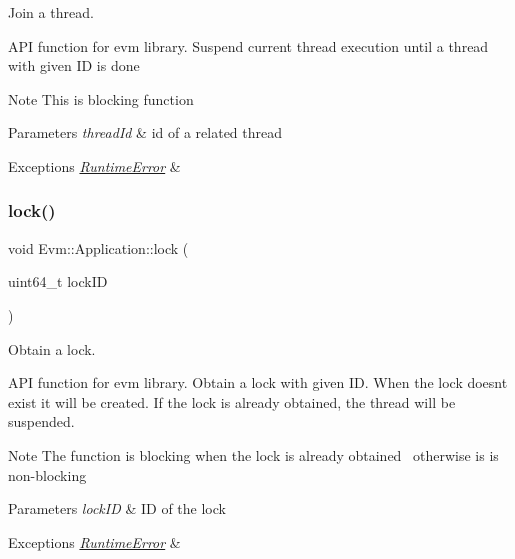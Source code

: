 Join a thread. 

A\+PI function for evm library. Suspend current thread execution until a thread with given ID is done \begin{DoxyNote}{Note}
This is blocking function 
\end{DoxyNote}

\begin{DoxyParams}{Parameters}
{\em thread\+Id} & id of a related thread \\
\hline
\end{DoxyParams}

\begin{DoxyExceptions}{Exceptions}
{\em \mbox{\hyperlink{struct_evm_1_1_runtime_error}{Runtime\+Error}}} & \\
\hline
\end{DoxyExceptions}
\mbox{\label{struct_evm_1_1_application_a102467a47420ec04d5ab1e68bd465579}} 
\subsubsection{\texorpdfstring{lock()}{lock()}}
{\footnotesize\ttfamily void Evm\+::\+Application\+::lock (\begin{DoxyParamCaption}\item[{uint64\+\_\+t}]{lock\+ID }\end{DoxyParamCaption})}



Obtain a lock. 

A\+PI function for evm library. Obtain a lock with given ID. When the lock doesn\textquotesingle{}t exist it will be created. If the lock is already obtained, the thread will be suspended. \begin{DoxyNote}{Note}
The function is blocking when the lock is already obtained~\newline
otherwise is is non-\/blocking 
\end{DoxyNote}

\begin{DoxyParams}{Parameters}
{\em lock\+ID} & ID of the lock \\
\hline
\end{DoxyParams}

\begin{DoxyExceptions}{Exceptions}
{\em \mbox{\hyperlink{struct_evm_1_1_runtime_error}{Runtime\+Error}}} & \\
\hline
\end{DoxyExceptions}
\mbox{\label{struct_evm_1_1_application_a0e55226ef456356c5d25f8da1c9ae926}} 
